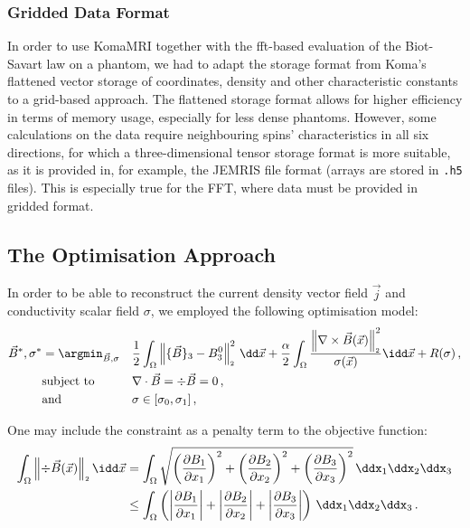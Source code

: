 \documentclass[10pt]{article}
\renewcommand{\norm}[1]{\left\lVert#1\right\rVert_{\scriptscriptstyle 2}}
\begin{document}
  \subsubsection{Gridded Data Format}
  In order to use KomaMRI together with the \gls{fft}-based evaluation of the Biot-Savart law on a phantom, we had to adapt the storage format from Koma's flattened vector storage of coordinates, density and other characteristic constants to a grid-based approach.
  The flattened storage format allows for higher efficiency in terms of memory usage, especially for less dense phantoms.
  However, some calculations on the data require neighbouring spins' characteristics in all six directions, for which a three-dimensional tensor storage format is more suitable, as it is provided in, for example, the JEMRIS file format (arrays are stored in \texttt{.h5} files).
  This is especially true for the FFT, where data must be provided in gridded format.

  \subsection{The Optimisation Approach}
  \label{sec:optimisation-procedure}
  In order to be able to reconstruct the current density vector field $\vec{j}$ and conductivity scalar field $\sigma$, we employed the following optimisation model:
  \begin{align*}
    \vec{B}^*, \sigma^* & = \argmin_{\vec{B}, \sigma} &  & \frac{1}{2} \int_\Omega \norm{\{\vec{B}\}_3 - B_3^0}^2 \,\dd\vec{x} + \frac{\alpha}{2} \int_\Omega \frac{\norm{\nabla \times \vec{B}(\vec{x})}^2}{\sigma(\vec{x})} \idd\vec{x} + R(\sigma)\,, \\
                        & \text{subject to}           &  & \nabla \cdot \vec{B} = \div \vec{B} = 0\,,                                                                                                                                                    \\
                        & \text{and}                  &  & \sigma \in [\sigma_0, \sigma_1]\,,
  \end{align*}

  One may include the constraint as a penalty term to the objective function:
  \begin{align*}
    \int_\Omega \norm{\div \vec{B}(\vec{x})} \idd\vec{x} & = \int_\Omega \sqrt{\left(\frac{\partial B_1}{\partial x_1}\right)^2 + \left(\frac{\partial B_2}{\partial x_2}\right)^2 + \left(\frac{\partial B_3}{\partial x_3}\right)^2} \,\ddx_1\ddx_2\ddx_3       \\
                                                         & \leq \int_\Omega \left(\left|\frac{\partial B_1}{\partial x_1}\right| + \left|\frac{\partial B_2}{\partial x_2}\right| + \left|\frac{\partial B_3}{\partial x_3}\right|\right) \,\ddx_1\ddx_2\ddx_3\,.
  \end{align*}
\end{document}
